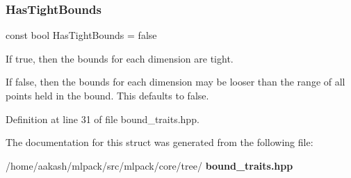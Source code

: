 \subsubsection{Has\+Tight\+Bounds}
{\footnotesize\ttfamily const bool Has\+Tight\+Bounds = false\hspace{0.3cm}{\ttfamily [static]}}



If true, then the bounds for each dimension are tight. 

If false, then the bounds for each dimension may be looser than the range of all points held in the bound. This defaults to false. 

Definition at line 31 of file bound\+\_\+traits.\+hpp.



The documentation for this struct was generated from the following file\+:\begin{DoxyCompactItemize}
\item 
/home/aakash/mlpack/src/mlpack/core/tree/\textbf{ bound\+\_\+traits.\+hpp}\end{DoxyCompactItemize}
